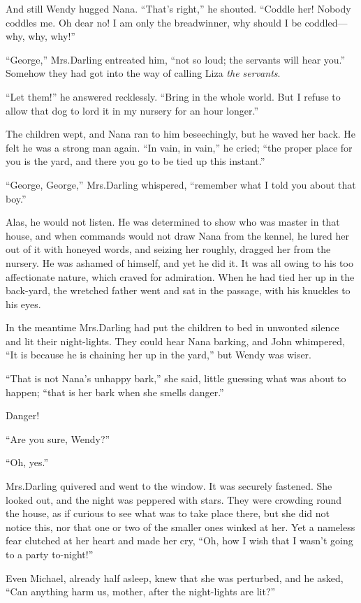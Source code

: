 And still Wendy hugged Nana.
“That’s right,” he shouted.
“Coddle her!
Nobody coddles me.
Oh dear no!
I am only the breadwinner, why should I be coddled—why, why, why!”

“George,” Mrs.\@ Darling entreated him, “not so loud;
the servants will hear you.”
Somehow they had got into the way of calling Liza \emph{the servants}.

“Let them!\@” he answered recklessly.
“Bring in the whole world.
But I refuse to allow that dog to lord it in my nursery for an hour longer.”

The children wept, and Nana ran to him beseechingly, but he waved her back.
He felt he was a strong man again.
“In vain, in vain,” he cried;
“the proper place for you is the yard,
and there you go to be tied up this instant.”

“George, George,” Mrs.\@ Darling whispered, “remember what I told you about that boy.”

Alas, he would not listen.
He was determined to show who was master in that house,
and when commands would not draw Nana from the kennel,
he lured her out of it with honeyed words,
and seizing her roughly, dragged her from the nursery.
He was ashamed of himself, and yet he did it.
It was all owing to his too affectionate nature,
which craved for admiration.
When he had tied her up in the back-yard,
the wretched father went and sat in the passage,
with his knuckles to his eyes.

In the meantime Mrs.\@ Darling had put the children to bed in unwonted silence and lit their night-lights.
They could hear Nana barking,
and John whimpered, “It is because he is chaining her up in the yard,” but Wendy was wiser.

“That is not Nana’s unhappy bark,” she said,
little guessing what was about to happen;
“that is her bark when she smells danger.”

Danger!

“Are you sure, Wendy?”

“Oh, yes.”

Mrs.\@ Darling quivered and went to the window.
It was securely fastened.
She looked out, and the night was peppered with stars.
They were crowding round the house,
as if curious to see what was to take place there,
but she did not notice this,
nor that one or two of the smaller ones winked at her.
Yet a nameless fear clutched at her heart and made her cry,
“Oh, how I wish that I wasn’t going to a party to-night!”

Even Michael, already half asleep, knew that she was perturbed,
and he asked, “Can anything harm us, mother, after the night-lights are lit?”

